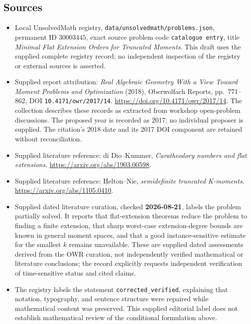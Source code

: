 \documentclass[11pt]{article}
\begin{document}
\subsection{Sources}
\begin{itemize}
\item Local UnsolvedMath registry, \texttt{data/unsolvedmath/problems.json}, permanent ID \(30003445\), exact source problem code \texttt{catalogue entry}, title \emph{Minimal Flat Extension Orders for Truncated Moments}. This draft uses the supplied complete registry record; no independent inspection of the registry or external sources is asserted.
\item Supplied report attribution: \emph{Real Algebraic Geometry With a View Toward Moment Problems and Optimization} (2018), Oberwolfach Reports, pp.\ 771--862, DOI \texttt{10.4171/owr/2017/14}. \url{https://doi.org/10.4171/owr/2017/14}. The collection describes these records as extracted from workshop open-problem discussions. The proposed year is recorded as 2017; no individual proposer is supplied. The citation's 2018 date and its 2017 DOI component are retained without reconciliation.
\item Supplied literature reference: di Dio--Kummer, \emph{Caratheodory numbers and flat extensions}. \url{https://arxiv.org/abs/1903.00598}.
\item Supplied literature reference: Helton--Nie, \emph{semidefinite truncated K-moments}. \url{https://arxiv.org/abs/1105.0410}.
\item Supplied dated literature curation, checked \textbf{2026-08-21}, labels the problem partially solved. It reports that flat-extension theorems reduce the problem to finding a finite extension, that sharp worst-case extension-degree bounds are known in general moment spaces, and that a good instance-sensitive estimate for the smallest \(k\) remains unavailable. These are supplied dated assessments derived from the OWR curation, not independently verified mathematical or literature conclusions; the record explicitly requests independent verification of time-sensitive status and cited claims.
\item The registry labels the statement \texttt{corrected\_verified}, explaining that notation, typography, and sentence structure were repaired while mathematical content was preserved. This supplied editorial label does not establish mathematical review of the conditional formulation above.
\end{itemize}
\end{document}
